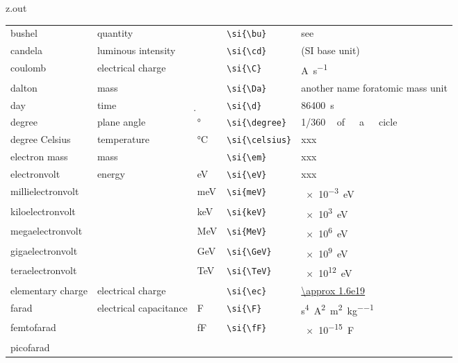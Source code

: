 \begin{VerbatimOut}{z.out}
{\begin{longtable}{@{}P{1.4in}P{1in}llP{1.8in}@{}}
    bushel&
      quantity&
      \si{\bu}&
      \verb+\si{\bu}+&
      see \cite{bushel}\\
    \vsp
    candela&
      luminous intensity&
      \si{\cd}&
      \verb+\si{\cd}+&
      (SI base unit)\\
    \vsp
    coulomb&
      electrical charge&
      \si{\C}&
      \verb+\si{\C}+&
      \si{\A\per\s}\\
    \vsp
    dalton&
      mass&
      \si{\Da}&
      \verb+\si{\Da}+&
      another name for\newline atomic mass unit\\
    \vsp
    day&
      time&
      \si{\d}&
      \verb+\si{\d}+&
      \SI{86400}{\s}\\
    \vsp
    degree&
      plane angle&
      \si{\degree}&
      \verb+\si{\degree}+&
      \SI{1/360}{\,of\ a\ cicle}\\
    \vsp
    degree Celsius&
      temperature&
      \si{\celsius}&
      \verb+\si{\celsius}+&
      xxx\\
    \vsp
    electron mass&
      mass&
      \si{\em}&
      \verb+\si{\em}+&
      xxx\\
    \vsp
    electronvolt&
      energy&
      \si{\eV}&
      \verb+\si{\eV}+&
      xxx\\
    \quad millielectronvolt&
      \ditto&
      \si{\meV}&
      \verb+\si{meV}+&
      \SI{e-3}{\eV}\\
    \quad kiloelectronvolt&
      \ditto&
      \si{\keV}&
      \verb+\si{keV}+&
      \SI{e3}{\eV}\\
    \quad megaelectronvolt&
      \ditto&
      \si{\MeV}&
      \verb+\si{MeV}+&
      \SI{e6}{\eV}\\
    \quad gigaelectronvolt&
      \ditto&
      \si{\GeV}&
      \verb+\si{\GeV}+&
      \SI{e9}{\eV}\\
    \quad teraelectronvolt&
      \ditto&
      \si{\TeV}&
      \verb+\si{\TeV}+&
      \SI{e12}{\eV}\\
    \vsp
    elementary charge&
      electrical charge&
      \si{\ec}&
      \verb+\si{\ec}+&
      \href{https://en.wikipedia.org/wiki/Elementary_charge}{\SI{\approx 1.6e19}{\C}}\\
    \vsp
    farad&
      electrical capacitance&
      \si{\F}&
      \verb+\si{\F}+&
      \si{\s\tothe{4}\A\squared\per\m\squared\per\kg}\\
    \quad femtofarad&
      \ditto&
      \si{\fF}&
      \verb+\si{\fF}+&
      \SI{e-15}{\F}\\
    \quad picofarad&

\end{longtable}}
\end{VerbatimOut}
